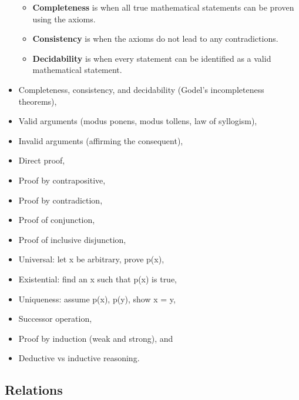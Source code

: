 \begin{itemize}
  \begin{itemize}
  \tightlist
  \item
    \textbf{Completeness} is when all true mathematical statements can
    be proven using the axioms.
  \item
    \textbf{Consistency} is when the axioms do not lead to any
    contradictions.
  \item
    \textbf{Decidability} is when every statement can be identified as a
    valid mathematical statement.
  \end{itemize}
\item
  Completeness, consistency, and decidability (Godel's incompleteness
  theorems),
\item
  Valid arguments (modus ponens, modus tollens, law of syllogism),
\item
  Invalid arguments (affirming the consequent),
\item
  Direct proof,
\item
  Proof by contrapositive,
\item
  Proof by contradiction,
\item
  Proof of conjunction,
\item
  Proof of inclusive disjunction,
\item
  Universal: let x be arbitrary, prove p(x),
\item
  Existential: find an x such that p(x) is true,
\item
  Uniqueness: assume p(x), p(y), show x = y,
\item
  Successor operation,
\item
  Proof by induction (weak and strong), and
\item
  Deductive vs inductive reasoning.
\end{itemize}

\hypertarget{relations}{%
\subsection{Relations}\label{relations}}

